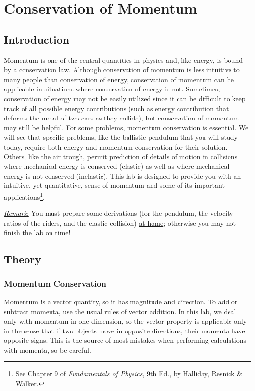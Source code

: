 \chapter{Conservation of Momentum}

\section{Introduction}
Momentum is one of the central quantities in physics and, like energy, is bound by a conservation law. Although conservation of momentum is less intuitive to many people than conservation of energy, conservation of momentum can be applicable in situations where conservation of energy is not. Sometimes, conservation of energy may not be easily utilized since it can be difficult to keep track of all possible energy contributions (such as energy contribution that deforms the metal of two cars as they collide), but conservation of momentum may still be helpful. For some problems, momentum conservation is essential. We will see that specific problems, like the ballistic pendulum that you will study today, require both energy and momentum conservation for their solution. Others, like the air trough, permit prediction of details of motion in collisions where mechanical energy is conserved (elastic) as well as where mechanical energy is not conserved (inelastic). This lab is designed to provide you with an intuitive, yet quantitative, sense of momentum and some of its important applications\footnote{See Chapter 9 of \emph{Fundamentals of Physics}, 9th Ed., by Halliday, Resnick \& Walker.}.\myskip

\underline{\emph{Remark}:} You must prepare some derivations (for the pendulum, the velocity ratios of the riders, and the elastic collision) \underline{at home}; otherwise you may not finish the lab on time!

\section{Theory}
\subsection{Momentum Conservation}
Momentum is a vector quantity, so it has magnitude and direction. To add or subtract momenta, use the usual rules of vector addition. In this lab, we deal only with momentum in one dimension, so the vector property is applicable only in the sense that if two objects move in opposite directions, their momenta have opposite signs. This is the source of most mistakes when performing calculations with momenta, so be careful. \myskip

